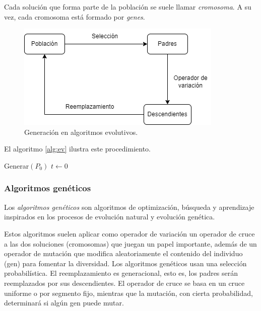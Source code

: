 Cada solución que forma parte de la población se suele llamar \emph{cromosoma}. A su vez, cada cromosoma está formado por \emph{genes}.

\begin{figure}[H]   
	\center
	\includegraphics[scale=0.5]{figures/Algoritmos_evolutivos.png}
	\caption{Generación en algoritmos evolutivos.}
    \label{fg:alg_ev}
\end{figure}

El algoritmo \ref{alg:ev} ilustra este procedimiento.

\begin{Ualgorithm}[H]
    \label{alg:ev}
    \small
    \DontPrintSemicolon
    Generar$(P_0)$ 
    $t \longleftarrow 0$\;
\end{Ualgorithm}

\subsubsection{Algoritmos genéticos}

Los \emph{algoritmos genéticos} son algoritmos de optimización, búsqueda y aprendizaje inspirados en los procesos de evolución natural y evolución genética.

Estos algoritmos suelen aplicar como operador de variación un operador de cruce a las dos soluciones (cromosomas) que juegan un papel importante, además de un operador de mutación que modifica aleatoriamente el contenido del individuo (gen) para fomentar la diversidad. Los algoritmos genéticos usan una selección probabilística. El reemplazamiento es generacional, esto es, los padres serán reemplazados por sus descendientes. El operador de cruce se basa en un cruce uniforme o por segmento fijo, mientras que la mutación, con cierta probabilidad, determinará si algún gen puede mutar.

